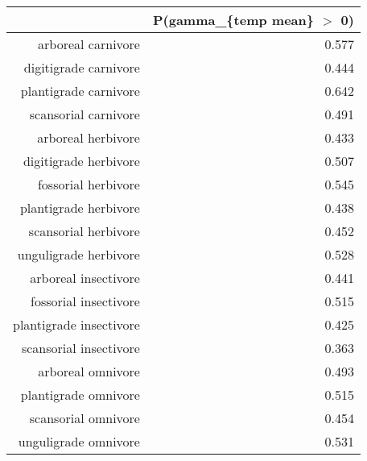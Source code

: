 \begin{table}[ht]
\centering
\begin{tabular}{rr}
  \hline
 & P(gamma\_\{temp mean\} $>$ 0) \\ 
  \hline
arboreal carnivore & 0.577 \\ 
  digitigrade carnivore & 0.444 \\ 
  plantigrade carnivore & 0.642 \\ 
  scansorial carnivore & 0.491 \\ 
  arboreal herbivore & 0.433 \\ 
  digitigrade herbivore & 0.507 \\ 
  fossorial herbivore & 0.545 \\ 
  plantigrade herbivore & 0.438 \\ 
  scansorial herbivore & 0.452 \\ 
  unguligrade herbivore & 0.528 \\ 
  arboreal insectivore & 0.441 \\ 
  fossorial insectivore & 0.515 \\ 
  plantigrade insectivore & 0.425 \\ 
  scansorial insectivore & 0.363 \\ 
  arboreal omnivore & 0.493 \\ 
  plantigrade omnivore & 0.515 \\ 
  scansorial omnivore & 0.454 \\ 
  unguligrade omnivore & 0.531 \\ 
   \hline
\end{tabular}
\label{tab:surv_temp}
\end{table}
